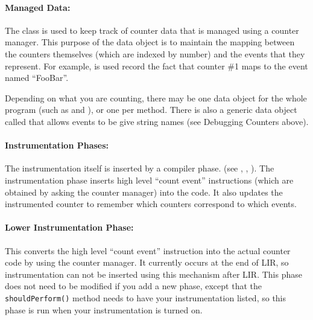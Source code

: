\paragraph{Managed Data:} The class 
is used to
keep track of counter data that is managed using a counter
manager. This purpose of the data object is to maintain the mapping
between the counters themselves (which are indexed by number) and the
events that they represent.  For example, 
is used record the fact that counter \#1
maps to the event named ``FooBar''.  


Depending on what you are counting, there may be one data object for
the whole program (such as 
 and
), 
or one per method.  There is also a
generic data object called 
that
allows events to be give string names (see Debugging Counters above).

\paragraph{Instrumentation Phases:}  The instrumentation itself is
inserted by a compiler phase.  (see
,
,
).  The instrumentation phase
inserts high level ``count event'' instructions (which are obtained by
asking the counter manager) into the code.  It also updates the
instrumented counter to remember which counters correspond to which
events.

\paragraph{Lower Instrumentation Phase:}  This 
converts the high level ``count event'' instruction into the actual
counter code by using the counter manager.  It currently occurs at the
end of LIR, so instrumentation can not be inserted using this
mechanism after LIR.  This phase does not need to be modified if you
add a new phase, except that the {\tt shouldPerform()} method needs to
have your instrumentation listed, so this phase is run when your
instrumentation is turned on.

